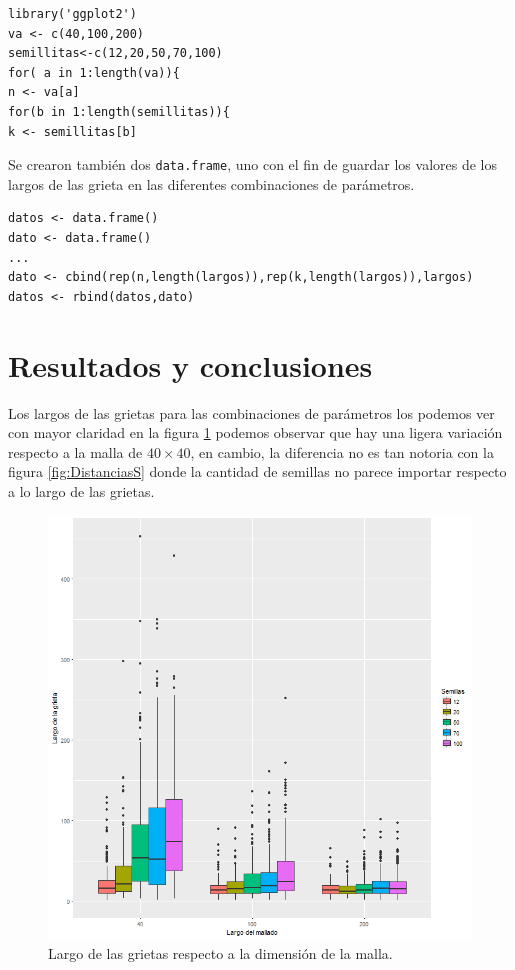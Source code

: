 \documentclass[a4paper]{article}
\begin{document}
\begin{lstlisting}[frame=single]
library('ggplot2')
va <- c(40,100,200)
semillitas<-c(12,20,50,70,100)
for( a in 1:length(va)){
n <- va[a]
for(b in 1:length(semillitas)){
k <- semillitas[b]
\end{lstlisting}

Se crearon también dos \texttt{data.frame}, uno con el fin de guardar los valores de los largos de las grieta en las diferentes combinaciones de parámetros.
\begin{lstlisting}[frame=single]
datos <- data.frame()
dato <- data.frame()
...
dato <- cbind(rep(n,length(largos)),rep(k,length(largos)),largos)
datos <- rbind(datos,dato)
\end{lstlisting}

\section{Resultados y conclusiones}
Los largos de las grietas para las combinaciones de parámetros los podemos ver con mayor claridad en la figura \ref{fig:DistanciasM} podemos observar que hay una ligera variación respecto a la malla de $40 \times 40$, en cambio, la diferencia no es tan notoria con la figura \ref{fig:DistanciasS} donde la cantidad de semillas no parece importar respecto a lo largo de las grietas.
\begin{figure}[h]
\centering
\includegraphics[width=0.7\linewidth]{DistanciasM}
\caption{Largo de las grietas respecto a la dimensión de la malla.}
\label{fig:DistanciasM}
\end{figure}
\end{document}

